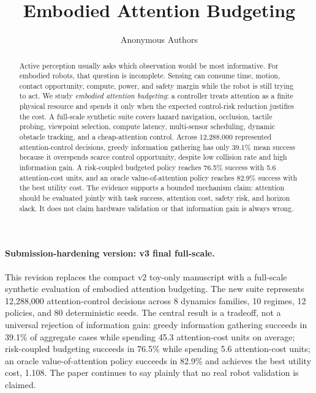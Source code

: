 \documentclass{article}
\title{Embodied Attention Budgeting}
\author{Anonymous Authors}
\date{}
\begin{document}
\maketitle

\paragraph{Submission-hardening version: v3 final full-scale.}
This revision replaces the compact v2 toy-only manuscript with a full-scale
synthetic evaluation of embodied attention budgeting. The new suite represents
12,288,000 attention-control decisions across 8 dynamics families, 10 regimes,
12 policies, and 80 deterministic seeds. The central result is a tradeoff, not a
universal rejection of information gain: greedy information gathering succeeds
in 39.1\% of aggregate cases while spending 45.3 attention-cost units on
average; risk-coupled budgeting succeeds in 76.5\% while spending 5.6
attention-cost units; an oracle value-of-attention policy succeeds in 82.9\%
and achieves the best utility cost, 1.108. The paper continues to say plainly
that no real robot validation is claimed.

\begin{abstract}
Active perception usually asks which observation would be most informative.
For embodied robots, that question is incomplete. Sensing can consume time,
motion, contact opportunity, compute, power, and safety margin while the robot
is still trying to act. We study \emph{embodied attention budgeting}: a
controller treats attention as a finite physical resource and spends it only
when the expected control-risk reduction justifies the cost. A full-scale
synthetic suite covers hazard navigation, occlusion, tactile probing,
viewpoint selection, compute latency, multi-sensor scheduling, dynamic obstacle
tracking, and a cheap-attention control. Across 12,288,000 represented
attention-control decisions, greedy information gathering has only 39.1\%
mean success because it overspends scarce control opportunity, despite low
collision rate and high information gain. A risk-coupled budgeted policy
reaches 76.5\% success with 5.6 attention-cost units, and an oracle
value-of-attention policy reaches 82.9\% success with the best utility cost.
The evidence supports a bounded mechanism claim: attention should be evaluated
jointly with task success, attention cost, safety risk, and horizon slack. It
does not claim hardware validation or that information gain is always wrong.
\end{abstract}
\end{document}
